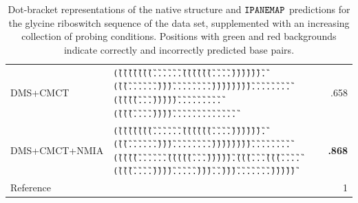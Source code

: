 \documentclass[a4,center,fleqn]{NAR}
\newcommand{\Software}[1]{$\text{\ttfamily #1}$}
\newcommand{\OurTool}{\Software{IPANEMAP}\xspace}
\begin{document}
\begin{table}
\begin{adjustbox}{max width=\linewidth}
\begin{tabular}{@{}llr@{}}
			DMS+CMCT & {\tt \G{(}\G{(}\G{(}\G{(}\G{(}\G{(}\G{(}\G{(}\G{.}\G{.}\G{.}\G{.}\G{.}\G{.}\G{(}\G{(}\G{(}\G{(}\G{(}\G{(}\G{.}\G{.}\G{.}\G{.}\G{)}\G{)}\G{)}\G{)}\G{)}\G{)}\G{.}\G{(}\G{(}\G{(}\B{(}\B{(}\B{(}\B{(}\B{(}\B{.}\B{.}\G{.}\G{.}\G{.}\G{.}\B{)}\B{)}\B{)}\B{)}\B{)}\G{.}\G{.}\G{)}\G{)}\G{)}\G{.}\G{.}\G{.}\G{.}\G{.}\G{.}\G{.}\G{.}\G{)}\G{)}\G{)}\G{)}\G{)}\G{)}\G{)}\G{)}\G{.}\G{.}\G{.}\G{.}\G{.}\G{.}\G{.}\B{(}\B{(}\B{.}\B{.}\B{.}\B{.}\B{(}\B{(}\B{(}\B{(}\B{(}\G{.}\G{(}\G{(}\G{(}\G{(}\G{(}\B{(}\G{.}\G{.}\G{.}\B{)}\G{)}\G{)}\G{)}\G{)}\G{)}\G{.}\B{.}\B{.}\B{.}\G{.}\G{.}\G{.}\G{.}\B{.}\B{.}\B{.}\G{.}\G{.}\G{.}\G{.}\G{(}\G{(}\G{(}\G{(}\G{.}\G{.}\G{.}\G{.}\G{)}\G{)}\G{)}\G{)}\G{.}\G{.}\G{.}\G{.}\G{.}\B{)}\B{)}\B{)}\B{)}\B{)}\G{.}\B{)}\B{)}\B{.}\G{.}\G{.}\G{.}\G{.}\G{.}\G{.}\G{.}\B{.}\B{.}\B{.}\B{.}\B{.}}&.658\\
			DMS+CMCT+NMIA & {\tt \G{(}\G{(}\G{(}\G{(}\G{(}\G{(}\G{(}\G{(}\G{.}\G{.}\G{.}\G{.}\G{.}\G{.}\G{(}\G{(}\G{(}\G{(}\G{(}\G{(}\G{.}\G{.}\G{.}\G{.}\G{)}\G{)}\G{)}\G{)}\G{)}\G{)}\G{.}\G{(}\G{(}\G{(}\B{(}\B{(}\B{(}\B{(}\B{(}\B{.}\B{.}\G{.}\G{.}\G{.}\G{.}\B{)}\B{)}\B{)}\B{)}\B{)}\G{.}\G{.}\G{)}\G{)}\G{)}\G{.}\G{.}\G{.}\G{.}\G{.}\G{.}\G{.}\G{.}\G{)}\G{)}\G{)}\G{)}\G{)}\G{)}\G{)}\G{)}\G{.}\G{.}\G{.}\G{.}\G{.}\G{.}\G{.}\G{.}\G{(}\G{(}\G{(}\G{(}\G{(}\G{.}\G{.}\G{.}\G{.}\G{.}\G{.}\G{(}\G{(}\G{(}\G{(}\G{(}\B{(}\G{.}\G{.}\G{.}\B{)}\G{)}\G{)}\G{)}\G{)}\G{)}\G{.}\G{(}\G{(}\G{(}\G{.}\G{.}\G{.}\B{(}\G{(}\G{(}\G{(}\G{.}\G{.}\G{.}\G{.}\G{(}\G{(}\G{(}\G{(}\G{.}\G{.}\G{.}\G{.}\G{)}\G{)}\G{)}\G{)}\G{.}\G{.}\G{.}\G{.}\G{.}\G{)}\G{)}\G{)}\B{)}\G{.}\G{.}\G{)}\G{)}\G{)}\G{.}\G{.}\G{.}\G{.}\G{.}\G{.}\G{.}\G{)}\G{)}\G{)}\G{)}\G{)}} & \textbf{.868}\\ \midrule
			Reference& {\tt \Base{((((((((......((((((....)))))).(((....(((.....)))...)))........))))))))........(((((......(((((.....))))).(((....(((....((((....)))).....)))...))).......)))))}}& 1\\
			\bottomrule
		\end{tabular}
	\end{adjustbox}\\
	\caption{Dot-bracket representations of the native structure and \OurTool{} predictions for the glycine riboswitch sequence of the \citet{Cordero2012} data set, supplemented with an increasing collection of probing conditions. Positions with green and red backgrounds indicate correctly and incorrectly predicted base pairs.}\label{fig:glycine_example}
\end{table}
\end{document}
